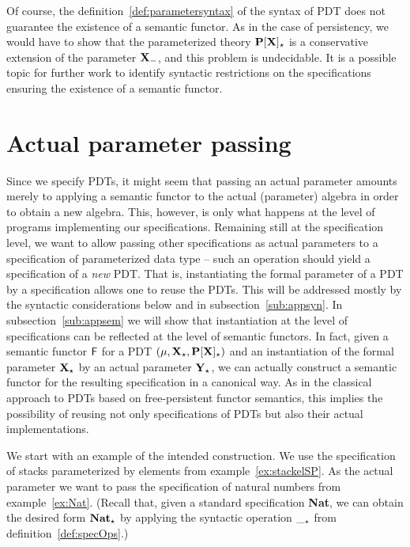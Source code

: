 Of course, the definition~\ref{def:parametersyntax} of the syntax of PDT does not guarantee the existence of a semantic
functor. As in the case of persistency, we would have to show that the
parameterized theory ${\bf P[X]_\star}$ is a conservative extension of the
parameter ${\bf X_-}$, and this problem is undecidable. It is a possible
topic for further work to identify syntactic restrictions on the
specifications ensuring the existence of a semantic functor.

\section{Actual parameter passing}\label{se:app}
Since we specify PDTs, it might seem that passing an
actual parameter amounts merely to applying a semantic functor to the actual (parameter)
algebra in order to obtain a new algebra. This, however, is only what happens
at the level of programs implementing our specifications. Remaining still at
the specification level, we want to allow passing other specifications as
actual parameters to a specification of parameterized data type -- 
such an operation should yield a specification of a {\em new} PDT.
That is, instantiating the formal parameter of a PDT 
by a specification allows one to reuse the PDTs. This will
be addressed mostly by the syntactic considerations below and in
subsection~\ref{sub:appsyn}. In subsection~\ref{sub:appsem} we will show that
instantiation at the level of specifications can be reflected at the level of
semantic functors. In fact, given a semantic functor ${\sf {F}}$ for a PDT $(\mu,{\bf X_\star},{\bf P[X]_\star})$ and
an instantiation of the formal parameter ${\bf X_\star}$ by an actual
parameter ${\bf Y_\star}$, we can actually construct a semantic functor for the
resulting specification in a canonical way. As in the classical approach to
PDTs based on free-persistent functor semantics, this implies the possibility of
reusing not only specifications of PDTs but also their actual implementations. 

We start with an example of the intended construction. We use
the specification of stacks parameterized by elements from example~\ref{ex:stackelSP}.
As the actual parameter we want to pass the specification of natural
numbers from example~\ref{ex:Nat}.
(Recall that, given a standard specification {\bf Nat}, we can obtain the
desired form ${\bf Nat}_\star$ by applying the syntactic operation $\__\star$
from definition~\ref{def:specOps}.)

